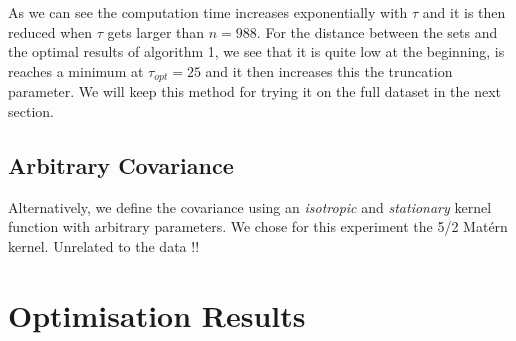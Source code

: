 As we can see the computation time increases exponentially with $\tau$ and it is then reduced when $\tau$ gets larger than $n=988$.  For the distance between the sets and the optimal results of algorithm 1, we see that it is quite low at the beginning, is reaches a minimum at $\tau_{opt} = 25$ and it then increases this the truncation parameter. We will keep this method for trying it on the full dataset in the next section. 

%
%


\subsection{Arbitrary Covariance}

Alternatively, we define the covariance using an \textit{isotropic} and \textit{stationary} kernel function with arbitrary parameters. We chose for this experiment the 5/2 Matérn kernel. Unrelated to the data !!













\section{Optimisation Results}

